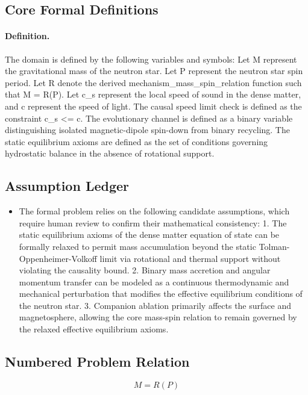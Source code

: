 \documentclass[conference]{IEEEtran}
\begin{document}
\subsection{Core Formal Definitions}
\paragraph{Definition.} The domain is defined by the following variables and symbols: Let M represent the gravitational mass of the neutron star. Let P represent the neutron star spin period. Let R denote the derived mechanism\_mass\_spin\_relation function such that M = R(P). Let c\_s represent the local speed of sound in the dense matter, and c represent the speed of light. The causal speed limit check is defined as the constraint c\_s <= c. The evolutionary channel is defined as a binary variable distinguishing isolated magnetic-dipole spin-down from binary recycling. The static equilibrium axioms are defined as the set of conditions governing hydrostatic balance in the absence of rotational support.

\subsection{Assumption Ledger}
\begin{itemize}
\item The formal problem relies on the following candidate assumptions, which require human review to confirm their mathematical consistency: 1. The static equilibrium axioms of the dense matter equation of state can be formally relaxed to permit mass accumulation beyond the static Tolman-Oppenheimer-Volkoff limit via rotational and thermal support without violating the causality bound. 2. Binary mass accretion and angular momentum transfer can be modeled as a continuous thermodynamic and mechanical perturbation that modifies the effective equilibrium conditions of the neutron star. 3. Companion ablation primarily affects the surface and magnetosphere, allowing the core mass-spin relation to remain governed by the relaxed effective equilibrium axioms.
\end{itemize}

\subsection{Numbered Problem Relation}
\begin{equation}
M = R(P)
\label{eq:formal-problem-and-hypotheses-block-4}
\end{equation}
\end{document}
